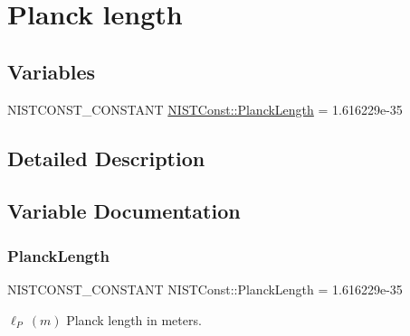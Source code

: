 \hypertarget{group___n_i_s_t_const-_planck_length}{}\section{Planck length}
\label{group___n_i_s_t_const-_planck_length}
\subsection*{Variables}
\begin{DoxyCompactItemize}
\item 
N\+I\+S\+T\+C\+O\+N\+S\+T\+\_\+\+C\+O\+N\+S\+T\+A\+NT \mbox{\hyperlink{group___n_i_s_t_const-_planck_length_ga2e9817f37b39c109d5a1e69596e467e7}{N\+I\+S\+T\+Const\+::\+Planck\+Length}} = 1.\+616229e-\/35
\end{DoxyCompactItemize}


\subsection{Detailed Description}


\subsection{Variable Documentation}
\mbox{\label{group___n_i_s_t_const-_planck_length_ga2e9817f37b39c109d5a1e69596e467e7}} 
\subsubsection{\texorpdfstring{Planck\+Length}{PlanckLength}}
{\footnotesize\ttfamily N\+I\+S\+T\+C\+O\+N\+S\+T\+\_\+\+C\+O\+N\+S\+T\+A\+NT N\+I\+S\+T\+Const\+::\+Planck\+Length = 1.\+616229e-\/35}

$\ell_P \ (m)$ Planck length in meters. 